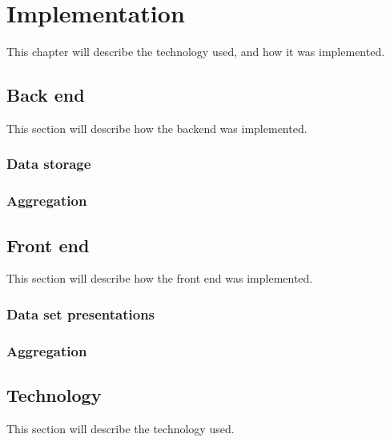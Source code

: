 \chapter{Implementation} %
\label{cha:implementation}
This chapter will describe the technology used, and how it was implemented. 

\section{Back end} %
\label{sec:back_end}
This section will describe how the backend was implemented.

\subsection{Data storage} %
\label{sub:back_data_storage}


\subsection{Aggregation} %
\label{sub:back_aggregation}



\clearpage
\section{Front end} %
\label{sec:front_end}
This section will describe how the front end was implemented. 
\subsection{Data set presentations} %
\label{sub:front_data_set_presentation}


\subsection{Aggregation} %
\label{sub:front_aggregation}



\clearpage
\section{Technology} %
This section will describe the technology used.
\label{sec:technology}

